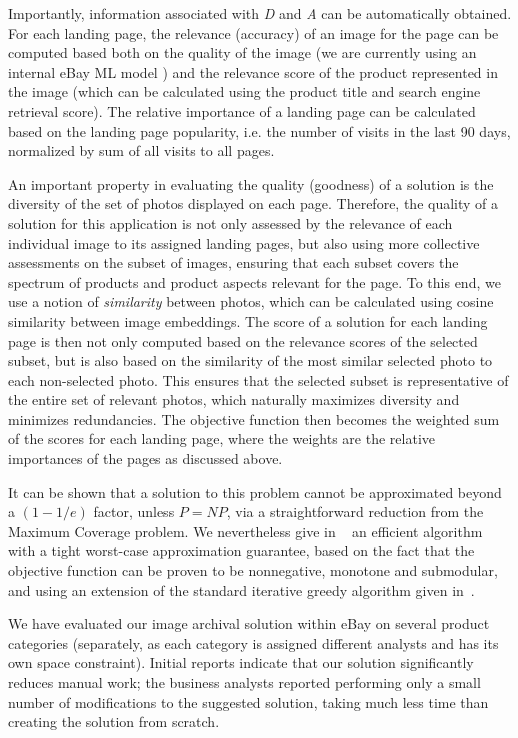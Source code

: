 \documentclass[11pt,dvipdfm]{article}
\begin{document}
Importantly, information associated with \textit{D} and \textit{A} can be automatically obtained.
For each landing page, the relevance (accuracy) of an image for the page can be computed based both on the quality of the image (we are currently using an internal eBay ML model \cite{dagan2021image}) and the relevance score of the product represented in the image (which can be calculated using the product title and search engine retrieval score).
The relative importance of a landing page can be calculated based on the landing page popularity, i.e. the number of visits in the last 90 days, normalized by sum of all visits to all pages.

An important property in evaluating the quality (goodness) of a solution is the diversity of the set of photos displayed on each page. Therefore, the quality of a solution for this application is not only assessed by the relevance of each individual image to its assigned landing pages, but also using more collective assessments on the subset of images, ensuring that each subset covers the spectrum of products and product aspects relevant for the page. 
To this end, we use a notion of {\em similarity} between photos, which can be calculated using cosine similarity between image embeddings. 
The score of a solution for each landing page is then not only computed based on the relevance scores of the selected subset, but is also based on the similarity of the most similar selected photo to each non-selected photo. This ensures that the selected subset is representative of the entire set of relevant photos, which naturally maximizes diversity and minimizes redundancies.  
The objective function then becomes the weighted sum of the scores for each landing page, where the weights are the relative importances of the pages as discussed above. 

It can be shown that a solution to this problem cannot be approximated beyond a $(1-1/e)$ factor, unless $P=NP$, via a straightforward reduction from the Maximum Coverage problem. We nevertheless give in ~\cite{SIGMOD-demo} an efficient algorithm with a tight worst-case approximation guarantee,
based on the fact that the objective function can be proven to be nonnegative, monotone and submodular, and using an extension of the standard iterative greedy algorithm given in~\cite{sviridenko2004note}. 



We have evaluated our image archival solution within eBay on several product categories (separately, as each category is assigned different analysts and has its own space constraint). Initial reports indicate that our solution significantly reduces manual work; the business analysts reported performing only a small number of modifications to the suggested solution, taking much less time than creating the solution from scratch.
\end{document}
